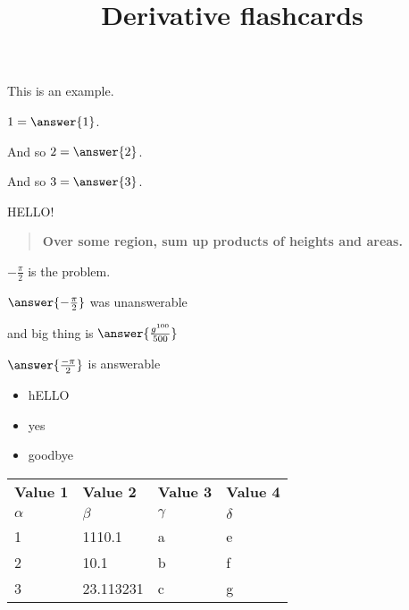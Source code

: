 \documentclass{ximera}
\title{Derivative flashcards}
\begin{document}
\begin{example}
  This is an example.

  $1 = \answer{1}$.
  
  \begin{problem}
    And so $2 = \answer{2}$.
  \end{problem}

  \begin{problem}
    And so $3 = \answer{3}$.
  \end{problem}
  
  \begin{hint}
    HELLO!
  \end{hint}  
\end{example}

\begin{quote}
\textbf{Over \textcolor{red!50!black}{some region},
\textcolor{green!70!black!70!blue}{sum up} products of
\textcolor{purple!50!blue!90!black}{heights} and \textcolor{blue!70!green}{areas}.}
\end{quote}

\begin{problem}
  $-\frac{\pi}{2}$ is the problem.
  
  $\answer{-\frac{\pi}{2}}$ was unanswerable

and
big thing is $\answer{\frac{g^{100}}{500}}$

$\answer{\frac{-\pi}{2}}$ is answerable
\end{problem}

\begin{itemize}
\item hELLO
\item yes
\item goodbye
\end{itemize}
\begin{exploration}
    \begin{tabular}{l|l|ll}
      \textbf{Value 1} & \textbf{Value 2} & \textbf{Value 3} & \textbf{Value 4}\\ %
      $\alpha$ & $\beta$ & $\gamma$ & $\delta$ \\ %
      \hline
      1 & 1110.1 & a & e\\ 
      2 & 10.1 & b & f\\ 
      3 & 23.113231 & c & g\\ 
    \end{tabular}
    \end{exploration}
\end{document}
